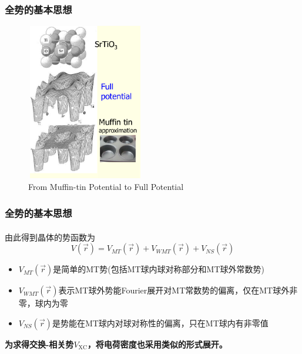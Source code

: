 \documentclass[cjk,slidestop,compress,mathserif,blue]{beamer}
\newcommand{\upcite}[1]{\hspace{0ex}\textsuperscript{\cite{#1}}} %
\begin{document}
\frame
{
\frametitle{全势的基本思想}
\vspace*{-13pt}
\begin{figure}[h!]
\centering
\includegraphics[height=2.70in,width=2.02in,viewport=1 22 507 715,clip]{Figures/MT_FP.png}
\caption{\tiny \textrm{From Muffin-tin Potential to Full Potential}}%
\label{Muffin_tin_FP}
\end{figure}
}

\frame
{
\frametitle{全势的基本思想}
由此得到晶体的势函数为\upcite{Nemoshkalenko-Antonov}
$$ V(\vec r)=V_{MT}(\vec r)+V_{WMT}(\vec r)+V_{NS}(\vec r)
  \label{eq:solid-64}
$$
\begin{itemize}
	\item $V_{MT}(\vec r)$是简单的\textrm{MT}势(包括\textrm{MT}球内球对称部分和\textrm{MT}球外常数势)
	\item $V_{WMT}(\vec r)$表示\textrm{MT}球外势能\textrm{Fourier}展开对\textrm{MT}常数势的偏离，仅在\textrm{MT}球外非零，球内为零
	\item $V_{NS}(\vec r)$是势能在\textrm{MT}球内对球对称性的偏离，只在\textrm{MT}球内有非零值
\end{itemize}
\textbf{\large 为求得交换-相关势$V_{\mathrm{XC}}$，将电荷密度也采用类似的形式展开。}
}
\end{document}
